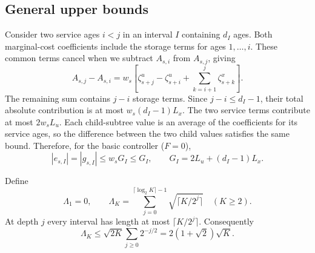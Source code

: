 \documentclass[11pt]{article}
\theoremstyle{plain}
\theoremstyle{remark}
\numberwithin{equation}{section}
\begin{document}
\subsection{General upper bounds}
Consider two service ages $i<j$ in an interval $I$ containing $d_I$ ages.
Both marginal-cost coefficients include the storage terms for ages
$1,\ldots,i$. These common terms cancel when we subtract $A_{s,i}$ from
$A_{s,j}$, giving
\begin{equation}\label{ch6:eq:leaf-difference}
 A_{s,j}-A_{s,i}=w_s\left[
 \zeta_{s+j}^u-\zeta_{s+i}^u+\sum_{k=i+1}^{j}\zeta_{s+k}^x\right].
\end{equation}
The remaining sum contains $j-i$ storage terms. Since $j-i\le d_I-1$,
their total absolute contribution is at most $w_s(d_I-1)L_x$. The two
service terms contribute at most $2w_sL_u$. Each child-subtree value is an
average of the coefficients for its service ages, so the difference between
the two child values satisfies the same bound. Therefore, for the basic
controller ($F=0$),
\begin{equation}\label{ch6:eq:general-node-bound}
 |e_{s,I}|=|g_{s,I}|\le w_sG_I\le G_I,
 \qquad G_I=2L_u+(d_I-1)L_x.
\end{equation}

Define
\begin{equation}\label{ch6:eq:S}
 \Lambda_1=0,\qquad
 \Lambda_K=\sum_{j=0}^{\lceil\log_2K\rceil-1}
 \sqrt{\lceil K/2^j\rceil}\quad(K\ge2).
\end{equation}
At depth $j$ every interval has length at most $\lceil K/2^j\rceil$.
Consequently
\begin{equation}\label{ch6:eq:S-bound}
 \Lambda_K\le\sqrt{2K}\sum_{j\ge0}2^{-j/2}
 =2(1+\sqrt2)\sqrt K.
\end{equation}
\end{document}
